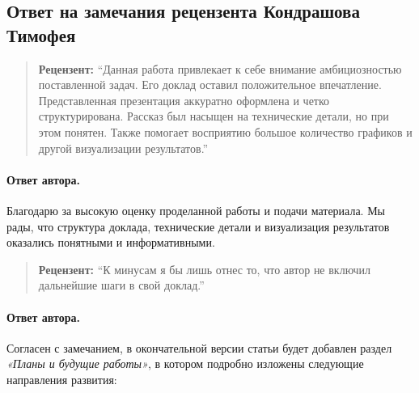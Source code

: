 \documentclass[11pt]{article}
\begin{document}
\pagestyle{empty}

\begin{center}
    \subsection*{Ответ на замечания рецензента Кондрашова Тимофея}
\end{center}

\begin{quote}
    \textbf{Рецензент:}
    ``Данная работа привлекает к себе внимание амбициозностью поставленной задач. Его доклад оставил положительное впечатление. Представленная презентация аккуратно оформлена и четко структурирована. Рассказ был насыщен на технические детали, но при этом понятен. Также помогает восприятию большое количество графиков и другой визуализации результатов.''
\end{quote}

\paragraph{Ответ автора.}
Благодарю за высокую оценку проделанной работы и подачи материала. Мы рады, что структура доклада, технические детали и визуализация результатов оказались понятными и информативными.

\begin{quote}
    \textbf{Рецензент:}
    ``К минусам я бы лишь отнес то, что автор не включил дальнейшие шаги в свой доклад.''
\end{quote}

\paragraph{Ответ автора.}
Согласен с замечанием, в окончательной версии статьи будет добавлен раздел \emph{«Планы и будущие работы»}, в котором подробно изложены следующие направления развития:
\end{document}
